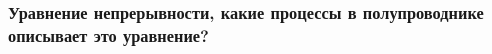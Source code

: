 \subsubsection{Уравнение непрерывности, какие процессы в полупроводнике описывает это уравнение?}


